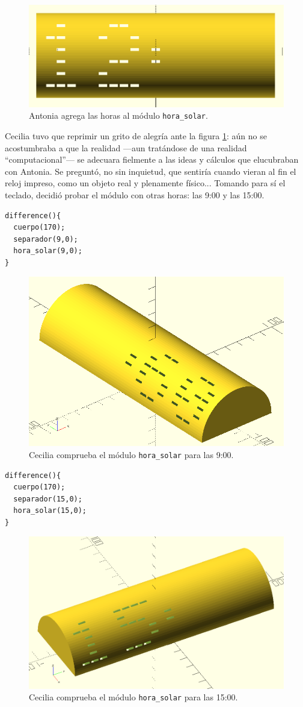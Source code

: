 \begin{figure}[ht]
  \centering \includegraphics[width=.8\textwidth]{imagenes/12_00}
  \caption{Antonia agrega las horas al módulo \lstinline!hora_solar!.}
  \label{fig:12_00}
\end{figure}


Cecilia tuvo que reprimir un grito de alegría ante la figura
\ref{fig:12_00}: aún no se acostumbraba a que la realidad ---aun
tratándose de una realidad ``computacional''--- se adecuara fielmente
a las ideas y cálculos que elucubraban con Antonia. Se preguntó, no
sin inquietud, que sentiría cuando vieran al fin el reloj impreso,
como un objeto real y plenamente físico... Tomando para sí el teclado,
decidió probar el módulo con otras horas: las 9:00 y las 15:00.

\begin{lstlisting}
difference(){
  cuerpo(170);
  separador(9,0);
  hora_solar(9,0);
}
\end{lstlisting}%

\begin{figure}[ht]
    \centering
    \includegraphics[width=.5\textwidth]{imagenes/9_00}
  \caption{Cecilia comprueba el módulo \lstinline!hora_solar! para las 9:00.}
\label{fig:9_00}
\end{figure}



\begin{lstlisting}
difference(){
  cuerpo(170);
  separador(15,0);
  hora_solar(15,0);
}
\end{lstlisting}%

\begin{figure}[ht]
    \centering
    \includegraphics[width=.56\textwidth]{imagenes/15_00}
  \caption{Cecilia comprueba el módulo \lstinline!hora_solar! para las 15:00.}
\label{fig:15_00}
\end{figure}


